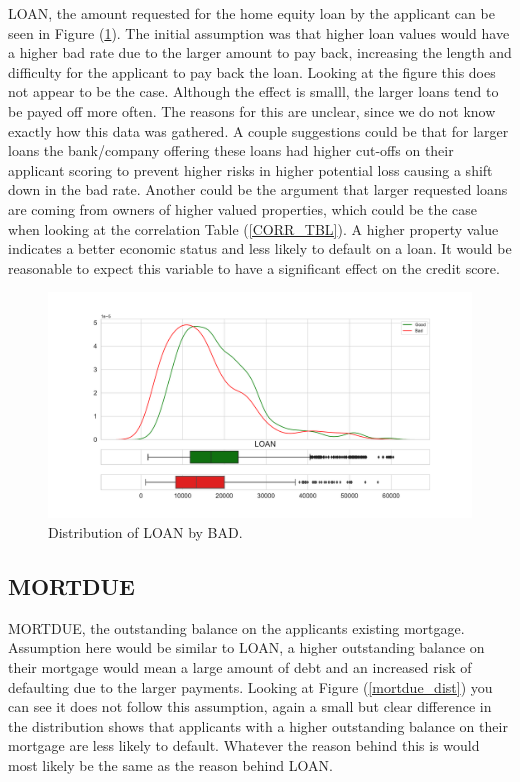 LOAN,  the amount requested for the home equity loan by the applicant can be seen in Figure (\ref{loan_dist}). The initial assumption was that higher loan values would have a higher bad rate due to the larger amount to pay back,  increasing the length and difficulty for the applicant to pay back the loan. Looking at the figure this does not appear to be the case. Although the effect is smalll, the larger loans tend to be payed off more often. The reasons for this are unclear, since we do not know exactly how this data was gathered. A couple suggestions could be that for larger loans the bank/company offering these loans had higher cut-offs on their applicant scoring to prevent higher risks in higher potential loss causing a shift down in the bad rate. Another could be the argument that larger requested loans are coming from owners of higher valued properties, which could be the case when looking at the correlation Table (\ref{CORR_TBL}). A higher property value indicates a better economic status and less likely to default on a loan. It would be reasonable to expect this variable to have a significant effect on the credit score.

\begin{figure}[H]
	\centering
	\includegraphics[scale=0.40]{figs/loan_dist.pdf}
	\caption{Distribution of LOAN by BAD. \label{loan_dist}}
\end{figure}

\subsection*{MORTDUE}

MORTDUE, the outstanding balance on the applicants existing mortgage. Assumption here would be similar to LOAN, a higher outstanding balance on their mortgage would mean a large amount of debt and an increased risk of defaulting due to the larger payments. Looking at Figure (\ref{mortdue_dist}) you can see it does not follow this assumption,  again a small but clear difference in the distribution shows that applicants with a higher outstanding balance on their mortgage are less likely to default. Whatever the reason behind this is would most likely be the same as the reason behind LOAN. 

